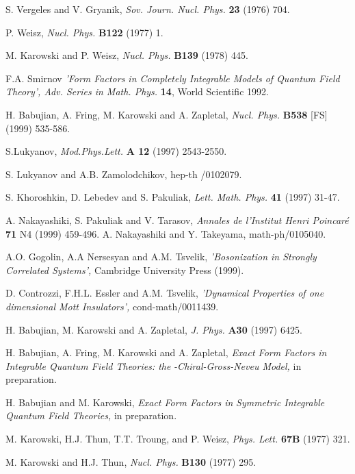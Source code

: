 \documentclass[a4paper,a4paper]{article}
\begin{document}
\begin{thebibliography}{99}
  S. Vergeles and V. Gryanik, \emph{Sov. Journ. Nucl. Phys.} 
\textbf{23} (1976) 704.

  P. Weisz, \emph{Nucl. Phys.} \textbf{B122} (1977) 1.

  M. Karowski and P. Weisz, \emph{Nucl. Phys.} \textbf{B139}
(1978) 445.

  F.A. Smirnov \emph{'Form Factors in Completely Integrable
Models of Quantum Field Theory', Adv. Series in Math. Phys.} \textbf{14},
World Scientific 1992.

  H. Babujian, A. Fring, M. Karowski and A. Zapletal, \emph{%
Nucl. Phys.} \textbf{B538} [FS] (1999) 535-586.

  S.Lukyanov, \emph{Mod.Phys.Lett.} \textbf{A 12} (1997)
2543-2550.

  S. Lukyanov and A.B. Zamolodchikov, hep-th /0102079.

  S. Khoroshkin, D. Lebedev and S. Pakuliak, \emph{Lett. Math.
Phys. }\textbf{41} (1997) 31-47.

  A. Nakayashiki, S. Pakuliak and V. Tarasov, \emph{Annales de
l'Institut Henri Poincar\'{e} }\textbf{71 }N4 (1999) 459-496.
  A. Nakayashiki and Y. Takeyama, math-ph/0105040.

  A.O. Gogolin, A.A Nersesyan and A.M. Tsvelik, \emph{%
'Bosonization in Strongly Correlated Systems', }Cambridge University Press
(1999).

  D. Controzzi, F.H.L. Essler and A.M. Tsvelik, \emph{%
'Dynamical Properties of one dimensional Mott Insulators', }%
cond-math/0011439.

  H. Babujian, M. Karowski and A. Zapletal, \emph{J. Phys.} 
\textbf{A30} (1997) 6425.

  H. Babujian, A. Fring, M. Karowski and A. Zapletal, \emph{%
Exact Form Factors in Integrable Quantum Field Theories: the }\coordHE{}\emph{%
-Chiral-Gross-Neveu Model,} in preparation.

  H. Babujian and M. Karowski, \emph{Exact Form Factors in }\coordHE{} \emph{Symmetric Integrable Quantum Field Theories,} in preparation.

  M. Karowski, H.J. Thun, T.T. Troung, and P. Weisz, \emph{%
Phys. Lett.} \textbf{67B} (1977) 321.

  M. Karowski and H.J. Thun, \emph{Nucl. Phys.} \textbf{B130}
(1977) 295.


\end{thebibliography}
\end{document}
